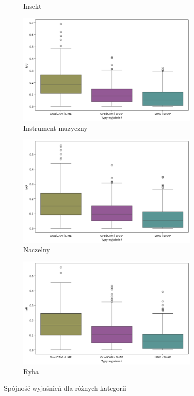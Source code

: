 \begin{figure}[!h]
\begin{subfigure}[b]{0.3\textwidth}
		\caption{Insekt}  \label{}
	\end{subfigure}
	\begin{subfigure}[b]{0.3\textwidth}
		\centering\includegraphics[width=.9\textwidth]{img/base_coherence_music}
		\caption{Instrument muzyczny}  \label{}
	\end{subfigure}
	\begin{subfigure}[b]{0.3\textwidth}
		\centering\includegraphics[width=.9\textwidth]{img/base_coherence_primate}
		\caption{Naczelny}  \label{}
	\end{subfigure}
	\begin{subfigure}[b]{0.3\textwidth}
		\centering\includegraphics[width=.9\textwidth]{img/base_coherence_fish}
		\caption{Ryba}  \label{}
	\end{subfigure}
	\caption{Spójność wyjaśnień dla różnych kategorii}
	\label{rys:coherence_category}
\end{figure}

